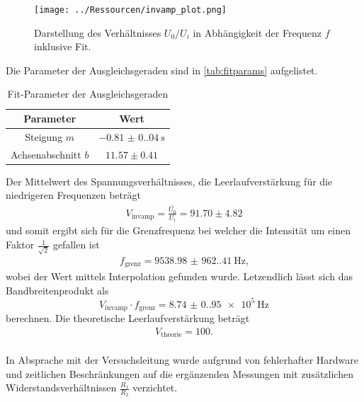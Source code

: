 \documentclass[12pt]{article}
\begin{document}
\begin{figure}[H]
  \centering
  \texttt{[image: ../Ressourcen/invamp\_plot.png]}
  \caption{Darstellung des Verhältnisses $U_0/U_i$ in Abhängigkeit der Frequenz $f$ inklusive Fit.}
  \label{fig:invamp_plot}
\end{figure}

Die Parameter der Ausgleichsgeraden sind in \autoref{tab:fitparams} aufgelistet.

\begin{table}[H]
  \centering
  \caption{Fit-Parameter der Ausgleichsgeraden}
  \begin{tabular}{c c}
  \toprule
  Parameter & Wert \\
  \midrule
  Steigung $m$ & $\SI{-0.81(0.04)}{\second}$ \\
  Achsenabschnitt $b$ & $11.57\pm0.41$ \\
  \bottomrule
  \end{tabular}
  \label{tab:fitparams}
\end{table}

Der Mittelwert des Spannungsverhältnisses, die Leerlaufverstärkung für die niedrigeren Frequenzen beträgt
\begin{align}
  V_\text{invamp} = \overline{\frac{U_0}{U_\text{i}}}=91.70\pm4.82
\end{align}
und somit ergibt sich für die Grenzfrequenz bei welcher die Intensität um einen Faktor $\frac{1}{\sqrt{2}}$ gefallen ist
\begin{align}
  f_\text{grenz}=\SI{9538.98(962.41)}{\hertz}\text{,}
\end{align}
wobei der Wert mittels Interpolation gefunden wurde.
Letzendlich lässt sich das Bandbreitenprodukt als
\begin{equation*}
  V_\text{invamp}\cdot f_{\text{grenz}}=\SI{8.74(0.95)e5}{\hertz}
\end{equation*}
berechnen. Die theoretische Leerlaufverstärkung beträgt
\begin{align}
  V_\text{theorie} = 100.
\end{align}
\\
In Absprache mit der Versuchsleitung wurde aufgrund von fehlerhafter Hardware und zeitlichen Beschränkungen auf die ergänzenden Messungen mit zusätzlichen Widerstandsverhältnissen $\frac{R_1}{R_2}$ verzichtet.
\end{document}

